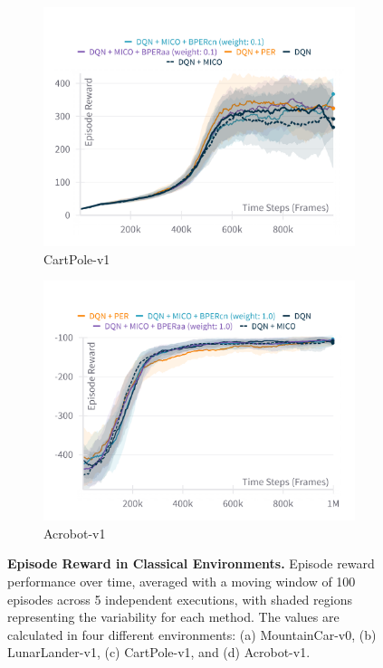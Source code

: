 \begin{figure}[h]
    \hfill
    \begin{subfigure}{0.45\textwidth}
        \includegraphics[width=\linewidth]{Results/general_results/episode_reward_cartpolev1.png}
        \caption{CartPole-v1}
        \label{fig:episode_reward_cartpolev1}
    \end{subfigure}
    \hfill
    \begin{subfigure}{0.45\textwidth}
        \includegraphics[width=\linewidth]{Results/general_results/episode_reward_acrobotv1.png}
        \caption{Acrobot-v1}
        \label{fig:episode_reward_acrobotv1}
    \end{subfigure}
    \caption[Episode Reward in Classical Environments]{\textbf{Episode Reward in Classical Environments.} Episode reward performance over time, averaged with a moving window of 100 episodes across 5 independent executions, with shaded regions representing the variability for each method. The values are calculated in four different environments: (a) MountainCar-v0, (b) LunarLander-v1, (c) CartPole-v1, and (d) Acrobot-v1.}
    \label{fig:episode_reward_more_envs}
\end{figure}

